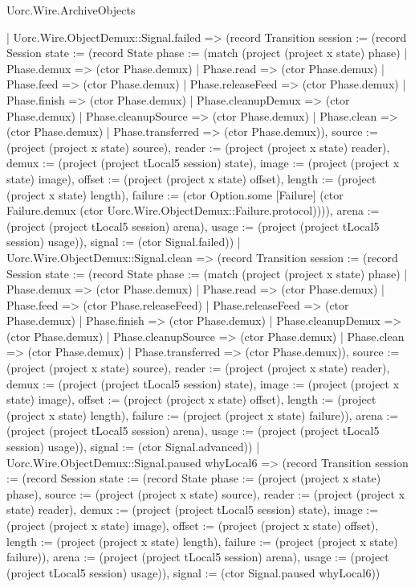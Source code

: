 \begin{lexlean}{Uorc.Wire.ArchiveObjects}
\begin{semanticmodule}
{          | Uorc.Wire.ObjectDemux::Signal.failed => (record Transition {session := (record Session {state := (record State {phase := (match (project (project x state) phase)
            | Phase.demux => (ctor Phase.demux)
            | Phase.read => (ctor Phase.demux)
            | Phase.feed => (ctor Phase.demux)
            | Phase.releaseFeed => (ctor Phase.demux)
            | Phase.finish => (ctor Phase.demux)
            | Phase.cleanupDemux => (ctor Phase.demux)
            | Phase.cleanupSource => (ctor Phase.demux)
            | Phase.clean => (ctor Phase.demux)
            | Phase.transferred => (ctor Phase.demux)), source := (project (project x state) source), reader := (project (project x state) reader), demux := (project (project tLocal5 session) state), image := (project (project x state) image), offset := (project (project x state) offset), length := (project (project x state) length), failure := (ctor Option.some [Failure] (ctor Failure.demux (ctor Uorc.Wire.ObjectDemux::Failure.protocol)))}), arena := (project (project tLocal5 session) arena), usage := (project (project tLocal5 session) usage)}), signal := (ctor Signal.failed)})
          | Uorc.Wire.ObjectDemux::Signal.clean => (record Transition {session := (record Session {state := (record State {phase := (match (project (project x state) phase)
            | Phase.demux => (ctor Phase.demux)
            | Phase.read => (ctor Phase.demux)
            | Phase.feed => (ctor Phase.releaseFeed)
            | Phase.releaseFeed => (ctor Phase.demux)
            | Phase.finish => (ctor Phase.demux)
            | Phase.cleanupDemux => (ctor Phase.demux)
            | Phase.cleanupSource => (ctor Phase.demux)
            | Phase.clean => (ctor Phase.demux)
            | Phase.transferred => (ctor Phase.demux)), source := (project (project x state) source), reader := (project (project x state) reader), demux := (project (project tLocal5 session) state), image := (project (project x state) image), offset := (project (project x state) offset), length := (project (project x state) length), failure := (project (project x state) failure)}), arena := (project (project tLocal5 session) arena), usage := (project (project tLocal5 session) usage)}), signal := (ctor Signal.advanced)})
          | Uorc.Wire.ObjectDemux::Signal.paused whyLocal6 => (record Transition {session := (record Session {state := (record State {phase := (project (project x state) phase), source := (project (project x state) source), reader := (project (project x state) reader), demux := (project (project tLocal5 session) state), image := (project (project x state) image), offset := (project (project x state) offset), length := (project (project x state) length), failure := (project (project x state) failure)}), arena := (project (project tLocal5 session) arena), usage := (project (project tLocal5 session) usage)}), signal := (ctor Signal.paused whyLocal6)})
}
\end{semanticmodule}
\end{lexlean}
